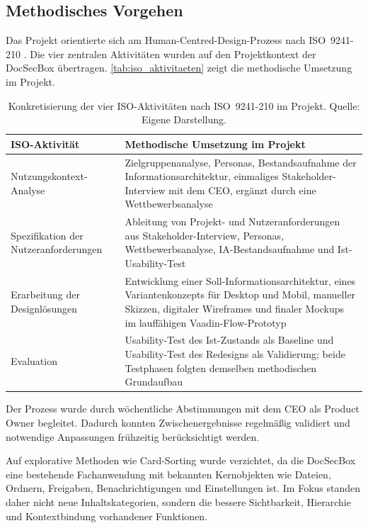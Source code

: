 \subsection{Methodisches Vorgehen}\label{sec:methodisches_vorgehen}

Das Projekt orientierte sich am Human-Centred-Design-Prozess nach ISO~9241-210 \parencite{iso_9241_210}. Die vier zentralen Aktivitäten wurden auf den Projektkontext der DocSecBox übertragen. \autoref{tab:iso_aktivitaeten} zeigt die methodische Umsetzung im Projekt.

\begin{table}[H]
    \centering
    \scriptsize
    \begin{tabular}{@{}p{4.0cm}p{8.5cm}@{}}
        \toprule
        \textbf{ISO-Aktivität} & \textbf{Methodische Umsetzung im Projekt} \\
        \midrule
        Nutzungskontext-Analyse & Zielgruppenanalyse, Personas, Bestandsaufnahme der Informationsarchitektur, einmaliges Stakeholder-Interview mit dem CEO, ergänzt durch eine Wettbewerbsanalyse \\
        \addlinespace
        Spezifikation der Nutzeranforderungen & Ableitung von Projekt- und Nutzeranforderungen aus Stakeholder-Interview, Personas, Wettbewerbsanalyse, IA-Bestandsaufnahme und Ist-Usability-Test \\
        \addlinespace
        Erarbeitung der Designlösungen & Entwicklung einer Soll-Informationsarchitektur, eines Variantenkonzepts für Desktop und Mobil, manueller Skizzen, digitaler Wireframes und finaler Mockups im lauffähigen Vaadin-Flow-Prototyp\footnotemark \\
        \addlinespace
        Evaluation & Usability-Test des Ist-Zustands als Baseline und Usability-Test des Redesigns als Validierung; beide Testphasen folgten demselben methodischen Grundaufbau \\
        \bottomrule
    \end{tabular}
    \caption[Konkretisierung der vier ISO-Aktivitäten]{Konkretisierung der vier ISO-Aktivitäten nach ISO~9241-210 im Projekt. Quelle: Eigene Darstellung.}
    \label{tab:iso_aktivitaeten}
\end{table}

Der Prozess wurde durch wöchentliche Abstimmungen mit dem CEO als Product Owner begleitet. Dadurch konnten Zwischenergebnisse regelmäßig validiert und notwendige Anpassungen frühzeitig berücksichtigt werden.

Auf explorative Methoden wie Card-Sorting wurde verzichtet, da die DocSecBox eine bestehende Fachanwendung mit bekannten Kernobjekten wie Dateien, Ordnern, Freigaben, Benachrichtigungen und Einstellungen ist. Im Fokus standen daher nicht neue Inhaltskategorien, sondern die bessere Sichtbarkeit, Hierarchie und Kontextbindung vorhandener Funktionen.
